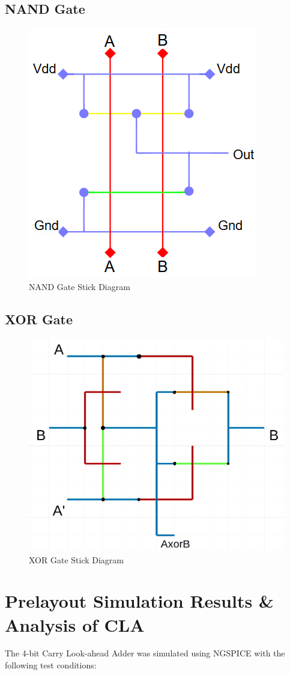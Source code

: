 \documentclass[conference]{IEEEtran}
\begin{document}
\subsection{NAND Gate}
\begin{figure}[H]
    \centering
    \includegraphics[width=0.5\linewidth]{sticknand.png}
    \caption{NAND Gate Stick Diagram}
    \label{fig:nand}
\end{figure}

\subsection{XOR Gate}
\begin{figure}[H]
    \centering
    \includegraphics[width=0.5\linewidth]{stickxor.jpg}
    \caption{XOR Gate Stick Diagram}
    \label{fig:xor}
\end{figure}



\section{Prelayout Simulation Results \& Analysis of CLA}
The 4-bit Carry Look-ahead Adder was simulated using NGSPICE with the following test conditions:
\end{document}
